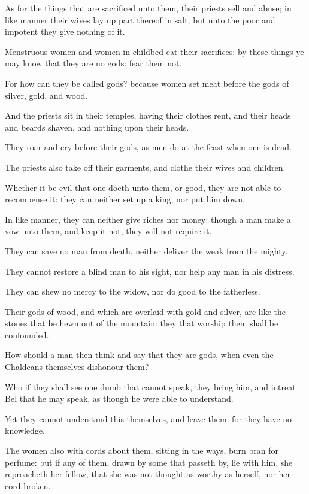 {\par }{\PP {}As for the things that are sacrificed unto them, their priests sell and abuse; in like manner their wives lay up part thereof in salt; but unto the poor and impotent they give nothing of it.
\par }{\PP {}Menstruous women and women in childbed eat their sacrifices: by these things ye may know that they are no gods: fear them not.
\par }{\PP {}For how can they be called gods? because women set meat before the gods of silver, gold, and wood.
\par }{\PP {}And the priests sit in their temples, having their clothes rent, and their heads and beards shaven, and nothing upon their heads.
\par }{\PP {}They roar and cry before their gods, as men do at the feast when one is dead.
\par }{\PP {}The priests also take off their garments, and clothe their wives and children.
\par }{\PP {}Whether it be evil that one doeth unto them, or good, they are not able to recompense it: they can neither set up a king, nor put him down.
\par }{\PP {}In like manner, they can neither give riches nor money: though a man make a vow unto them, and keep it not, they will not require it.
\par }{\PP {}They can save no man from death, neither deliver the weak from the mighty.
\par }{\PP {}They cannot restore a blind man to his sight, nor help any man in his distress.
\par }{\PP {}They can shew no mercy to the widow, nor do good to the fatherless.
\par }{\PP {}Their gods of wood, and which are overlaid with gold and silver, are like the stones that be hewn out of the mountain: they that worship them shall be confounded.
\par }{\PP {}How should a man then think and say that they are gods, when even the Chaldeans themselves dishonour them?
\par }{\PP {}Who if they shall see one dumb that cannot speak, they bring him, and intreat Bel that he may speak, as though he were able to understand.
\par }{\PP {}Yet they cannot understand this themselves, and leave them: for they have no knowledge.
\par }{\PP {}The women also with cords about them, sitting in the ways, burn bran for perfume: but if any of them, drawn by some that passeth by, lie with him, she reproacheth her fellow, that she was not thought as worthy as herself, nor her cord broken.
}

